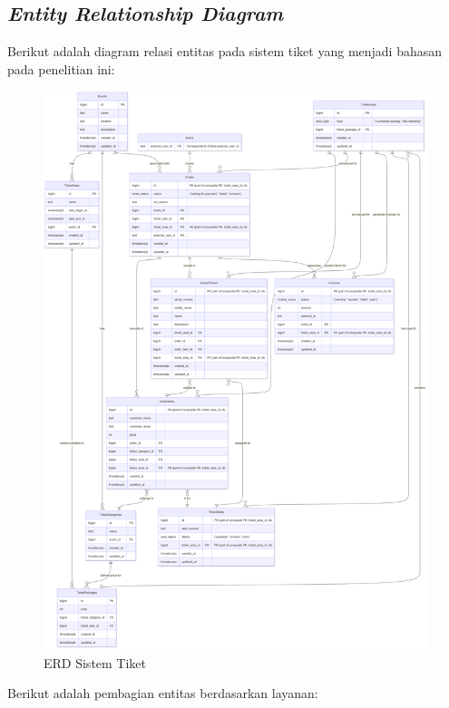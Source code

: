 \subsection{\textit{Entity Relationship Diagram}}

Berikut adalah diagram relasi entitas pada sistem tiket yang menjadi bahasan pada penelitian ini:

\begin{figure}[htbp]
    \centering
    \includegraphics[width=1\textwidth]{resources/chapter-3/erd.png}
    \caption{ERD Sistem Tiket}
    \label{fig:ticket-system-erd-proposal}
\end{figure}

Berikut adalah pembagian entitas berdasarkan layanan:

